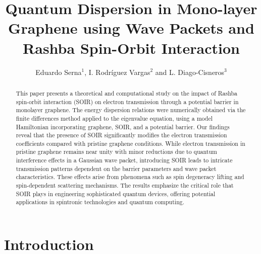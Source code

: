 \documentclass{../assets/templates/iopjournal}
\begin{document}
    \title{Quantum Dispersion in Mono-layer Graphene using Wave Packets and Rashba Spin-Orbit Interaction}
    \author{Eduardo Serna$^1$, I. Rodr\'iguez Vargas$^2$ and L. Diago-Cisneros$^3$}


    \begin{abstract}
        This paper presents a theoretical and computational study on the impact of Rashba spin-orbit interaction (SOIR) on electron transmission through a potential barrier in monolayer graphene.
        The energy dispersion relations were numerically obtained via the finite differences method applied to the eigenvalue equation, using a model Hamiltonian incorporating graphene, SOIR, and a potential barrier.
        Our findings reveal that the presence of SOIR significantly modifies the electron transmission coefficients compared with pristine graphene conditions.
        While electron transmission in pristine graphene remains near unity with minor reductions due to quantum interference effects in a Gaussian wave packet, introducing SOIR leads to intricate transmission patterns dependent on the barrier parameters and wave packet characteristics.
        These effects arise from phenomena such as spin degeneracy lifting and spin-dependent scattering mechanisms.
        The results emphasize the critical role that SOIR plays in engineering sophisticated quantum devices, offering potential applications in spintronic technologies and quantum computing.
    \end{abstract}





    \section{Introduction}\label{sec:introduction}
    
\end{document}
